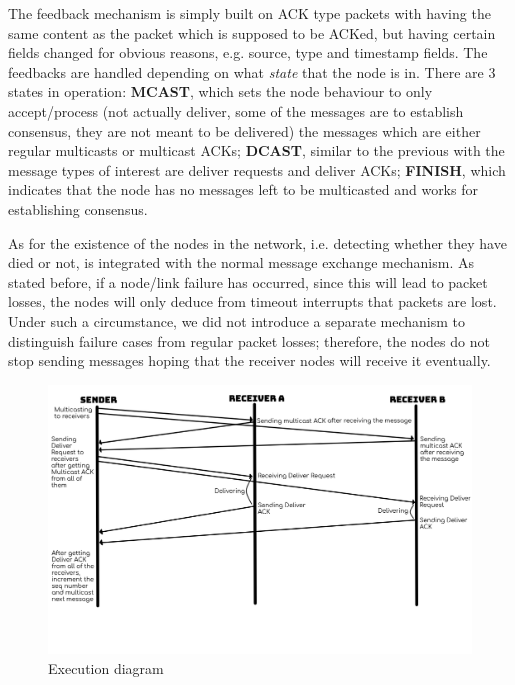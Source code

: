 \documentclass[a4paper, 12pt]{article}
\begin{document}
The feedback mechanism is simply built on ACK type packets with having the same content as the packet which is supposed to be ACKed, but having certain fields changed for obvious reasons, e.g. source, type and timestamp fields. The feedbacks are handled depending on what \textit{state} that the node is in. There are 3 states in operation: \textbf{MCAST}, which sets the node behaviour to only accept/process (not actually deliver, some of the messages are to establish consensus, they are not meant to be delivered) the messages which are either regular multicasts or multicast ACKs; \textbf{DCAST}, similar to the previous with the message types of interest are deliver requests and deliver ACKs; \textbf{FINISH}, which indicates that the node has no messages left to be multicasted and works for establishing consensus.

As for the existence of the nodes in the network, i.e. detecting whether they have died or not, is integrated with the normal message exchange mechanism. As stated before, if a node/link failure has occurred, since this will lead to packet losses, the nodes will only deduce from timeout interrupts that packets are lost. Under such a circumstance, we did not introduce a separate mechanism to distinguish failure cases from regular packet losses; therefore, the nodes do not stop sending messages hoping that the receiver nodes will receive it eventually.

\begin{figure}[h]
\centering
   \includegraphics[scale=0.45]{diagram.png}
   \caption{Execution diagram}
   \label{diagram}
\end{figure}
\end{document}
